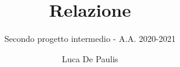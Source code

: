 \documentclass[italian,oneside,headinclude,10pt]{scrartcl}
\begin{document}
\author{Luca De Paulis}
\title{Relazione}
\subtitle{Secondo progetto intermedio - A.A. 2020-2021}
\date{\vspace{-4ex}}

\maketitle



\end{document}
